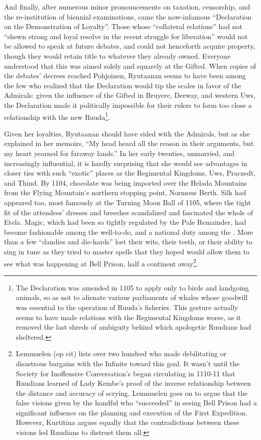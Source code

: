 \documentclass[12pt]{report}
\begin{document}
And finally, after numerous minor pronouncements on taxation,
censorship, and the re-institution of biennial examinations, came the
now-infamous ``Declaration on the Demonstration of Loyalty''.  Those
whose ``collateral relations'' had not ``shewn strong and loyal resolve
in the recent struggle for liberation'' would not be allowed to speak
at future debates, and could not henceforth acquire property, though
they would retain title to whatever they already owned.  Everyone
understood that this was aimed solely and squarely at the Gifted.
When copies of the debates' decrees reached Pohjoinen, Ryutaanan seems
to have been among the few who realized that the Declaration would tip
the scales in favor of the Admirals: given the influence of the Gifted
in Bruyere, Derway, and western Uws, the Declaration made it
politically impossible for their rulers to form too close a
relationship with the new Ruuda\footnote{The Declaration was amended
in 1105 to apply only to birds and landgoing animals, so as not to
alienate various parliaments of whales whose goodwill was essential to
the operation of Ruuda's fisheries.  This gesture actually seems to
have made relations with the Regimental Kingdoms worse, as it removed
the last shreds of ambiguity behind which apologetic Ruudians had
sheltered.}.

Given her loyalties, Ryutaanan should have sided with the Admirals,
but as she explained in her memoirs, ``My head heard all the reason in
their arguments, but my heart yearned for faraway lands.''  In her
early twenties, unmarried, and increasingly influential, it is hardly
surprising that she would see advantages in closer ties with such
``exotic'' places as the Regimental Kingdoms, Uws, Praczedt, and Thind.
By 1104, chocolate was being imported over the Helada Mountains from
the Flying Mountain's northern stopping point, Normous Berth.  Silk
had appeared too, most famously at the Turning Moon Ball of 1105,
where the tight fit of the attendees' dresses and breeches scandalized
and fascinated the whole of Etela.  Magic, which had been so tightly
regulated by the Pale Remainder, had become fashionable among the
well-to-do, and a national duty among the {\aemott}.  More than a few
``dandies and die-hards'' lost their wits, their teeth, or their ability
to sing in tune as they tried to master spells that they hoped would
allow them to see what was happening at Bell Prison, half a continent
away\footnote{Lemmuelen (op cit) lists over two hundred {\aemott} who
made debilitating or disastrous bargains with the Infinite toward this
goal.  It wasn't until the Society for Inoffensive Conversation's
 began circulating in 1110-11 that
Ruudians learned of Lady Kembe's proof of the inverse relationship
between the distance and accuracy of scrying.  Lemmuelen goes on to
argue that the false visions given by the handful who ``succeeded'' in
seeing Bell Prison had a significant influence on the planning and
execution of the First Expedition.  However, Kurtitina argues equally
that the contradictions between these visions led Ruudians to distrust
them all.}.
\end{document}
